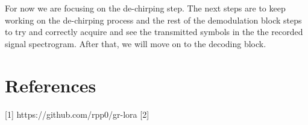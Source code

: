 \documentclass{icmmcm}
\begin{document}
For now we are focusing on the de-chirping step. The next steps are to keep working on the de-chirping process and the rest of the demodulation block steps to try and correctly acquire and see the transmitted symbols in the the recorded signal spectrogram. After that, we will move on to the decoding block.

\section{References}
[1] https://github.com/rpp0/gr-lora
[2] 
\end{document}
